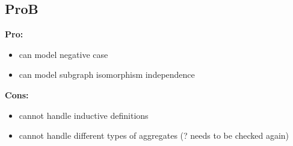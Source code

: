 \subsection{ProB}

\textbf{Pro:}
\begin{itemize}
  \item can model negative case
  \item can model subgraph isomorphism independence
\end{itemize}
\textbf{Cons:}
\begin{itemize}
  \item cannot handle inductive definitions
  \item cannot handle different types of aggregates (? needs to be checked again)
\end{itemize}


%
%

